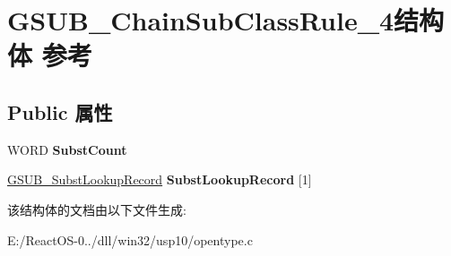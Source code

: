 \hypertarget{struct_g_s_u_b___chain_sub_class_rule__4}{}\section{G\+S\+U\+B\+\_\+\+Chain\+Sub\+Class\+Rule\+\_\+4结构体 参考}
\label{struct_g_s_u_b___chain_sub_class_rule__4}
\subsection*{Public 属性}
\begin{DoxyCompactItemize}
\item 
\mbox{\label{struct_g_s_u_b___chain_sub_class_rule__4_a15f32be4983d42811b733cf2fd7cf101}} 
W\+O\+RD {\bfseries Subst\+Count}
\item 
\mbox{\label{struct_g_s_u_b___chain_sub_class_rule__4_a5c76c60b0953a01a5f6a3ac0a9e9e0a5}} 
\hyperlink{struct_g_s_u_b___subst_lookup_record}{G\+S\+U\+B\+\_\+\+Subst\+Lookup\+Record} {\bfseries Subst\+Lookup\+Record} \mbox{[}1\mbox{]}
\end{DoxyCompactItemize}


该结构体的文档由以下文件生成\+:\begin{DoxyCompactItemize}
\item 
E\+:/\+React\+O\+S-\/0../dll/win32/usp10/opentype.\+c\end{DoxyCompactItemize}
